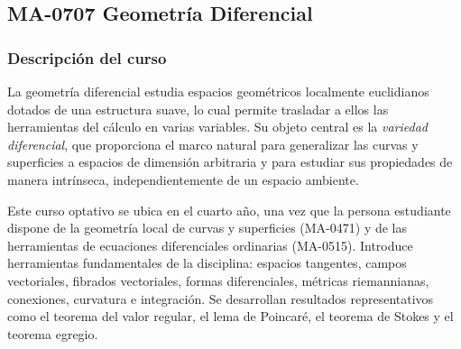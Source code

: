 \newpage
\subsection*{MA-0707 Geometría Diferencial}

\hypertarget{MA0707}{}
\begin{refsection}
\begin{table}[H]
\end{table}

\subsubsection*{Descripción del curso}

La geometría diferencial estudia espacios geométricos localmente euclidianos dotados de una estructura suave, lo cual permite trasladar a ellos las herramientas del cálculo en varias variables. Su objeto central es la \emph{variedad diferencial}, que proporciona el marco natural para generalizar las curvas y superficies a espacios de dimensión arbitraria y para estudiar sus propiedades de manera intrínseca, independientemente de un espacio ambiente.

Este curso optativo se ubica en el cuarto año, una vez que la persona estudiante dispone de la geometría local de curvas y superficies (MA-0471) y de las herramientas de ecuaciones diferenciales ordinarias (MA-0515). Introduce herramientas fundamentales de la disciplina: espacios tangentes, campos vectoriales, fibrados vectoriales, formas diferenciales, métricas riemannianas, conexiones, curvatura e integración. Se desarrollan resultados representativos como el teorema del valor regular, el lema de Poincaré, el teorema de Stokes y el teorema egregio.


\end{refsection}
